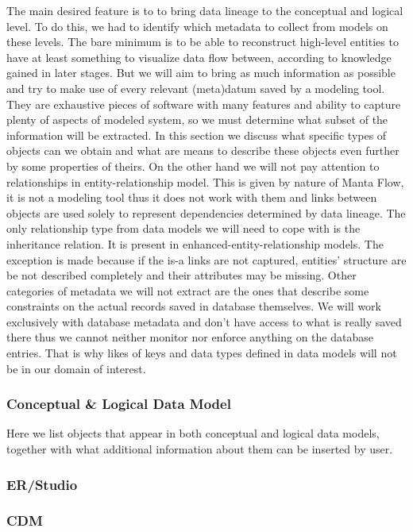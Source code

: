The main desired feature is to to bring data lineage to the conceptual and logical level. To do this, we had to identify which metadata to collect from models on these levels.
The bare minimum is to be able to reconstruct high-level entities to have at least something to visualize data flow between, according to knowledge gained in later stages.
But we will aim to bring as much information as possible and try to make use of every relevant (meta)datum saved by a modeling tool. 
They are exhaustive pieces of software with many features and ability to capture plenty of aspects of modeled system, so we must determine what subset of the information will be extracted.
In this section we discuss what specific types of objects can we obtain and what are means to describe these objects even further by some properties of theirs. 
On the other hand we will not pay attention to relationships in entity-relationship model. This is given by nature of Manta Flow, it is not a modeling tool thus it does not work with them and links between objects are used solely to represent dependencies determined by data lineage.
The only relationship type from data models we will need to cope with is the inheritance relation. It is present in enhanced-entity-relationship models. The exception is made because if the is-a links are not captured, entities' structure are be not described completely and their attributes may be missing.
Other categories of metadata we will not extract are the ones that describe some constraints on the actual records saved in database themselves. We will work exclusively with database metadata and don't have access to what is really saved there thus we cannot neither monitor nor enforce anything on the database entries. That is why likes of keys and data types defined in data models will not be in our domain of interest.

\subsubsection{Conceptual \& Logical Data Model}

Here we list objects that appear in both conceptual and logical data models, together with what additional information about them can be inserted by user.

\subsubsection{ER/Studio}

\subsubsection{CDM}

